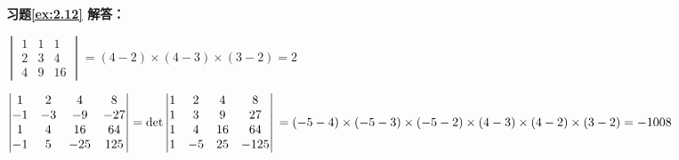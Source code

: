 \vspace{1.5em}

\textbf{习题\ref{ex:2.12} 解答：}

\enum
\item[(1)] $\begin{vmatrix} 1 & 1 & 1 \\ 2 & 3 & 4 \\ 4 & 9 & 16 \end{vmatrix} = (4-2)\times(4-3)\times(3-2) = 2$

\item[(2)] $\begin{vmatrix} 1 & 2 & 4 & 8 \\ -1 & -3 & -9 & -27 \\ 1 & 4 & 16 & 64 \\ -1 & 5 & -25 & 125 \end{vmatrix} = \det\begin{vmatrix} 1 & 2 & 4 & 8 \\ 1 & 3 & 9 & 27 \\ 1 & 4 & 16 & 64 \\ 1 & -5 & 25 & -125 \end{vmatrix} \\ = (-5-4)\times(-5-3)\times(-5-2)\times(4-3) \times(4-2)\times(3-2)= -1008$


